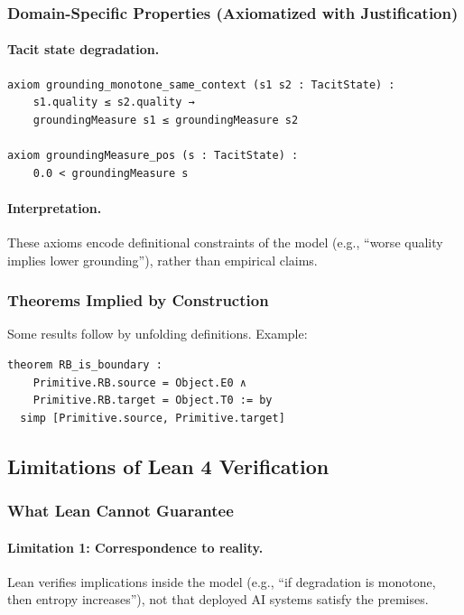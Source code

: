 \subsubsection{Domain-Specific Properties (Axiomatized with Justification)}
\paragraph{Tacit state degradation.}
\begin{verbatim}
axiom grounding_monotone_same_context (s1 s2 : TacitState) :
    s1.quality ≤ s2.quality →
    groundingMeasure s1 ≤ groundingMeasure s2

axiom groundingMeasure_pos (s : TacitState) :
    0.0 < groundingMeasure s
\end{verbatim}

\paragraph{Interpretation.}
These axioms encode definitional constraints of the model (e.g., ``worse quality implies lower grounding''), rather than empirical claims.

\subsubsection{Theorems Implied by Construction}
Some results follow by unfolding definitions. Example:
\begin{verbatim}
theorem RB_is_boundary :
    Primitive.RB.source = Object.E0 ∧
    Primitive.RB.target = Object.T0 := by
  simp [Primitive.source, Primitive.target]
\end{verbatim}

\subsection{Limitations of Lean 4 Verification}

\subsubsection{What Lean Cannot Guarantee}
\paragraph{Limitation 1: Correspondence to reality.}
Lean verifies implications inside the model (e.g., ``if degradation is monotone, then entropy increases''), not that deployed AI systems satisfy the premises.


